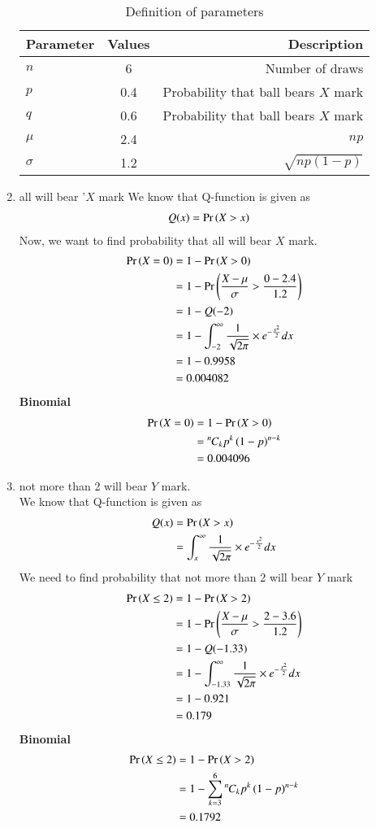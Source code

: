 \documentclass[journal,12pt,twocolumn]{IEEEtran}
\theoremstyle{remark}
\begin{document}
\begin{enumerate}
\begin{table}[!ht]
\centering
\begin{tabular}{|l|c|r|}
    \hline
    Parameter & Values & Description\\
    \hline
    $n$ & 6 & Number of draws\\
    \hline
    $p$ & 0.4 & Probability that ball bears $X$ mark \\
    \hline
    $q$ & 0.6 & Probability that ball bears $X$ mark \\
    \hline
    $\mu$ & 2.4 & $np$ \\
    \hline
    $\sigma $ & 1.2 & $\sqrt{np(1 - p)} $\\
    \hline
\end{tabular}
\caption{Definition of parameters}
\label{tab:gaussian/9/3/17}
\end{table}
\item all will bear '$X$ mark
We know that Q-function is given as
\begin{align}
Q(x) &= \Pr\left(X > x\right)
\end{align}
Now, we want to find probability that all will bear $X$ mark.
\begin{align}
\Pr\left(X = 0\right) &=1-\Pr\left(X > 0\right) \\
&=1-\Pr\left(\frac{X - \mu}{\sigma} > \frac{0 - 2.4}{1.2}\right) \\
&= 1- Q(-2)\\
&= 1- \int_{-2}^{\infty}\frac{1}{\sqrt{2\pi}}\times e^{-\frac{x^2}{2}}dx\\
&= 1-0.9958\\
&=0.004082
\end{align}
\textbf{Binomial}
\begin{align}
\Pr\left(X =0\right) &= 1 - \Pr\left(X> 0\right) \\
&= {{}^{n}\mkern-1muC_{k}}p^k\left(1-p\right)^{n-k} \\
&= 0.004096
\end{align}
\item not more than 2 will bear $Y$ mark.\\
We know that Q-function is given as\\
\begin{align}
Q(x) &= \Pr\left(X > x\right)\\
&= \int_{x}^{\infty}\frac{1}{\sqrt{2\pi}}\times e^{-\frac{x^2}{2}}dx
\end{align}
We need to find probability that not more than 2 will bear $Y$ mark
\begin{align}
\Pr\left(X \leq 2\right) &= 1 - \Pr\left(X > 2\right)\\
&= 1 - \Pr\left(\frac{X - \mu}{\sigma} > \frac{2 - 3.6}{1.2}\right) \\
&= 1 - Q(-1.33)\\
&= 1 - \int_{-1.33}^{\infty}\frac{1}{\sqrt{2\pi}}\times e^{-\frac{x^2}{2}}dx\\
&= 1- 0.921\\
&=0.179
\end{align}
\textbf{Binomial}
\begin{align}
\Pr\left(X\leq 2\right) &= 1 - \Pr\left(X>2\right) \\
&= 1-\sum_{k=3}^{6} {{}^{n}\mkern-1muC_{k}}p^k\left(1-p\right)^{n-k} \\
&= 0.1792
\end{align}


\end{enumerate}
\end{document}
